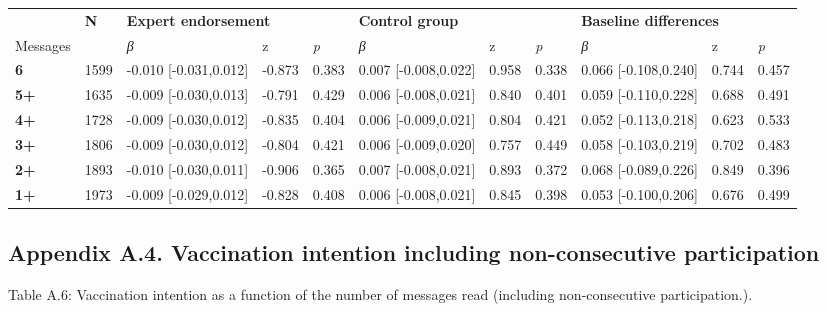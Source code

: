 \documentclass[authordate, empirical]{jote-new-article}
\begin{document}
	\begin{table}
		\begin{tabularx}{\linewidth}{@{} l l l l l l l l l l l @{}}
			\hline  & \textbf{N} & \multicolumn{2}{l}{\textbf{Expert endorsement}} &  &
			\multicolumn{2}{l}{\textbf{Control group}} &  &
			\multicolumn{2}{l}{\textbf{Baseline differences}} &  \\

			 Messages &  & \emph{β} & z & \emph{p} & \emph{β} & z & \emph{p} &
			\emph{β} & z & \emph{p} \\

			\hline \textbf{6} & 1599 & -0.010 [-0.031,0.012] & -0.873 & 0.383 & 0.007 [-0.008,0.022]
			& 0.958 & 0.338 & 0.066 [-0.108,0.240] & 0.744 & 0.457 \\

			 \textbf{5+} & 1635 & -0.009 [-0.030,0.013] & -0.791 & 0.429 & 0.006 [-0.008,0.021]
			& 0.840 & 0.401 & 0.059 [-0.110,0.228] & 0.688 & 0.491 \\

			 \textbf{4+} & 1728 & -0.009 [-0.030,0.012] & -0.835 & 0.404 & 0.006 [-0.009,0.021]
			& 0.804 & 0.421 & 0.052 [-0.113,0.218] & 0.623 & 0.533 \\

			 \textbf{3+} & 1806 & -0.009 [-0.030,0.012] & -0.804 & 0.421 & 0.006 [-0.009,0.020]
			& 0.757 & 0.449 & 0.058 [-0.103,0.219] & 0.702 & 0.483 \\

			 \textbf{2+} & 1893 & -0.010 [-0.030,0.011] & -0.906 & 0.365 & 0.007 [-0.008,0.021]
			& 0.893 & 0.372 & 0.068 [-0.089,0.226] & 0.849 & 0.396 \\

			 \textbf{1+} & 1973 & -0.009 [-0.029,0.012] & -0.828 & 0.408 & 0.006 [-0.008,0.021]
			& 0.845 & 0.398 & 0.053 [-0.100,0.206] & 0.676 & 0.499 \\


		\end{tabularx}
	\end{table}

	\subsection{Appendix A.4. Vaccination intention including non-consecutive participation}



	Table A.6: Vaccination intention as a function of the number of messages read (including non-consecutive participation.).
\end{document}
